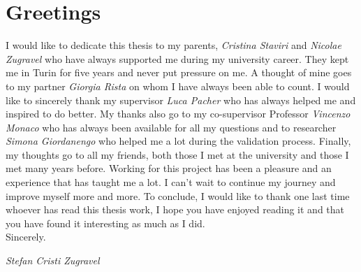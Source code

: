 \chapter*{Greetings}
\vspace*{3cm}
\noindent I would like to dedicate this thesis to my parents, \textit{Cristina Staviri} and \textit{Nicolae Zugravel} who have always supported me during my university career.
They kept me in Turin for five years and never put pressure on me.
A thought of mine goes to my partner \textit{Giorgia Rista} on whom I have always been able to count.
I would like to sincerely thank my supervisor \textit{Luca Pacher} who has always helped me and inspired to do better.
My thanks also go to my co-supervisor Professor \textit{Vincenzo Monaco} who has always been available for all my questions and to researcher \textit{Simona Giordanengo} who helped me a lot during the validation process.
Finally, my thoughts go to all my friends, both those I met at the university and those I met many years before.
Working for this project has been a pleasure and an experience that has taught me a lot.
I can't wait to continue my journey and improve myself more and more.
To conclude, I would like to thank one last time whoever has read this thesis work, I hope you have enjoyed reading it and that you have found it interesting as much as I did.\\
\noindent Sincerely.
\vspace*{1cm}
\begin{flushright}
	\textit{Stefan Cristi Zugravel}
\end{flushright}